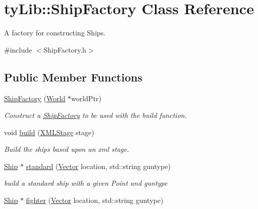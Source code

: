 \hypertarget{classty_lib_1_1_ship_factory}{}\section{ty\+Lib\+:\+:Ship\+Factory Class Reference}
\label{classty_lib_1_1_ship_factory}


A factory for constructing Ships.  




{\ttfamily \#include $<$Ship\+Factory.\+h$>$}

\subsection*{Public Member Functions}
\begin{DoxyCompactItemize}
\item 
\hypertarget{classty_lib_1_1_ship_factory_ad58c16d75982bd5f99bdbbe6d2dad26f}{}\hyperlink{classty_lib_1_1_ship_factory_ad58c16d75982bd5f99bdbbe6d2dad26f}{Ship\+Factory} (\hyperlink{classty_lib_1_1_world}{World} $\ast$world\+Ptr)\label{classty_lib_1_1_ship_factory_ad58c16d75982bd5f99bdbbe6d2dad26f}

\begin{DoxyCompactList}\small\item\em Construct a \hyperlink{classty_lib_1_1_ship_factory}{Ship\+Factory} to be used with the build function. \end{DoxyCompactList}\item 
\hypertarget{classty_lib_1_1_ship_factory_a7f87891179b4bb089b36fd2066df1cbc}{}void \hyperlink{classty_lib_1_1_ship_factory_a7f87891179b4bb089b36fd2066df1cbc}{build} (\hyperlink{structty_lib_1_1_x_m_l_stage}{X\+M\+L\+Stage} stage)\label{classty_lib_1_1_ship_factory_a7f87891179b4bb089b36fd2066df1cbc}

\begin{DoxyCompactList}\small\item\em Build the ships based upon an xml stage. \end{DoxyCompactList}\item 
\hypertarget{classty_lib_1_1_ship_factory_ac206831924c50056e738599505bb22bd}{}\hyperlink{classty_lib_1_1_ship}{Ship} $\ast$ \hyperlink{classty_lib_1_1_ship_factory_ac206831924c50056e738599505bb22bd}{standard} (\hyperlink{classty_lib_1_1_vector}{Vector} location, std\+::string guntype)\label{classty_lib_1_1_ship_factory_ac206831924c50056e738599505bb22bd}

\begin{DoxyCompactList}\small\item\em build a standard ship with a given Point and guntype \end{DoxyCompactList}\item 
\hypertarget{classty_lib_1_1_ship_factory_a3783c2c6d3d0dba5ec1c16ef3915e2f1}{}\hyperlink{classty_lib_1_1_ship}{Ship} $\ast$ \hyperlink{classty_lib_1_1_ship_factory_a3783c2c6d3d0dba5ec1c16ef3915e2f1}{fighter} (\hyperlink{classty_lib_1_1_vector}{Vector} location, std\+::string guntype)\label{classty_lib_1_1_ship_factory_a3783c2c6d3d0dba5ec1c16ef3915e2f1}


\end{DoxyCompactItemize}
